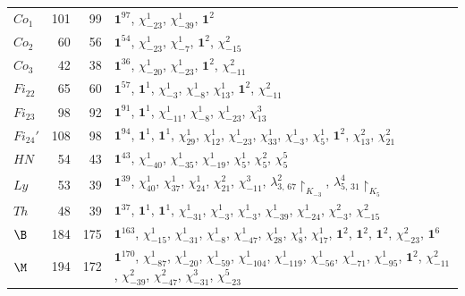 \begin{longtable}{@{}lrrp{}@{}}
$Co_1$ & 101 & 99 & $\mathbf 1^{97}$, $\chi_{-23}^{1}$, $\chi_{-39}^{1}$, $\mathbf 1^{2}$\\
$Co_2$ & 60 & 56 & $\mathbf 1^{54}$, $\chi_{-23}^{1}$, $\chi_{-7}^{1}$, $\mathbf 1^{2}$, $\chi_{-15}^{2}$\\
$Co_3$ & 42 & 38 & $\mathbf 1^{36}$, $\chi_{-20}^{1}$, $\chi_{-23}^{1}$, $\mathbf 1^{2}$, $\chi_{-11}^{2}$\\
$Fi_{22}$ & 65 & 60 & $\mathbf 1^{57}$, $\mathbf 1^{1}$, $\chi_{-3}^{1}$, $\chi_{-8}^{1}$, $\chi_{13}^{1}$, $\mathbf 1^{2}$, $\chi_{-11}^{2}$\\
$Fi_{23}$ & 98 & 92 & $\mathbf 1^{91}$, $\mathbf 1^{1}$, $\chi_{-11}^{1}$, $\chi_{-8}^{1}$, $\chi_{-23}^{1}$, $\chi_{13}^{3}$\\
$Fi_{24}'$ & 108 & 98 & $\mathbf 1^{94}$, $\mathbf 1^{1}$, $\mathbf 1^{1}$, $\chi_{29}^{1}$, $\chi_{12}^{1}$, $\chi_{-23}^{1}$, $\chi_{33}^{1}$, $\chi_{-3}^{1}$, $\chi_{5}^{1}$, $\mathbf 1^{2}$, $\chi_{13}^{2}$, $\chi_{21}^{2}$\\
$HN$ & 54 & 43 & $\mathbf 1^{43}$, $\chi_{-40}^{1}$, $\chi_{-35}^{1}$, $\chi_{-19}^{1}$, $\chi_{5}^{1}$, $\chi_{5}^{2}$, $\chi_{5}^{5}$\\
$Ly$ & 53 & 39 & $\mathbf 1^{39}$, $\chi_{40}^{1}$, $\chi_{37}^{1}$, $\chi_{24}^{1}$, $\chi_{21}^{2}$, $\chi_{-11}^{3}$, $\lambda^{2}_{3,\,67}\!\!\restriction_{K_{-3}}$, $\lambda^{4}_{5,\,31}\!\!\restriction_{K_5}$\\
$Th$ & 48 & 39 & $\mathbf 1^{37}$, $\mathbf 1^{1}$, $\mathbf 1^{1}$, $\chi_{-31}^{1}$, $\chi_{-3}^{1}$, $\chi_{-3}^{1}$, $\chi_{-39}^{1}$, $\chi_{-24}^{1}$, $\chi_{-3}^{2}$, $\chi_{-15}^{2}$\\
$\B$ & 184 & 175 & $\mathbf 1^{163}$, $\chi_{-15}^{1}$, $\chi_{-31}^{1}$, $\chi_{-8}^{1}$, $\chi_{-47}^{1}$, $\chi_{28}^{1}$, $\chi_{8}^{1}$, $\chi_{17}^{1}$, $\mathbf 1^{2}$, $\mathbf 1^{2}$, $\mathbf 1^{2}$, $\chi_{-23}^{2}$, $\mathbf 1^{6}$\\
$\M$ & 194 & 172 & $\mathbf 1^{170}$, $\chi_{-87}^{1}$, $\chi_{-20}^{1}$, $\chi_{-59}^{1}$, $\chi_{-104}^{1}$, $\chi_{-119}^{1}$, $\chi_{-56}^{1}$, $\chi_{-71}^{1}$, $\chi_{-95}^{1}$, $\mathbf 1^{2}$, $\chi_{-11}^{2}$, $\chi_{-39}^{2}$, $\chi_{-47}^{2}$, $\chi_{-31}^{3}$, $\chi_{-23}^{5}$\\
\bottomrule
\end{longtable}
\endgroup
